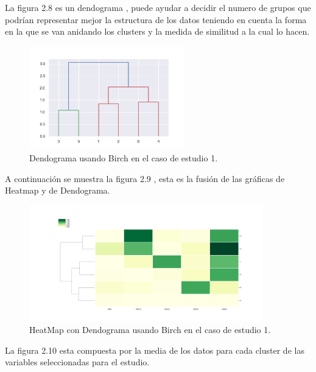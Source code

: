 
	La figura 2.8 es un dendograma , puede ayudar a decidir el numero de grupos que podrían representar
	mejor la estructura de los datos teniendo en cuenta la forma en la que se van anidando los clusters
	y la medida de similitud a la cual lo hacen. \\

	\begin{figure}[htb]
		\centering
		\includegraphics[width=0.6\textwidth]{./imagenes/caso1/dendograma_caso1_Birch}
		\caption{Dendograma usando Birch en el caso de estudio 1.} \label{fig:1}
	\end{figure}

	A continuación se muestra la figura 2.9 , esta es la fusión de las gráficas de 
	Heatmap y de Dendograma.  \\

	\begin{figure}[htb]
		\centering
		\includegraphics[width=0.9\textwidth]{./imagenes/caso1/heatmapcondendograma_caso1_Birch}
		\caption{HeatMap con Dendograma usando Birch en el caso de estudio 1.} \label{fig:1}
	\end{figure}

	La figura 2.10 esta compuesta por la media de los datos para cada cluster de las variables seleccionadas
	para el estudio. \\ 

